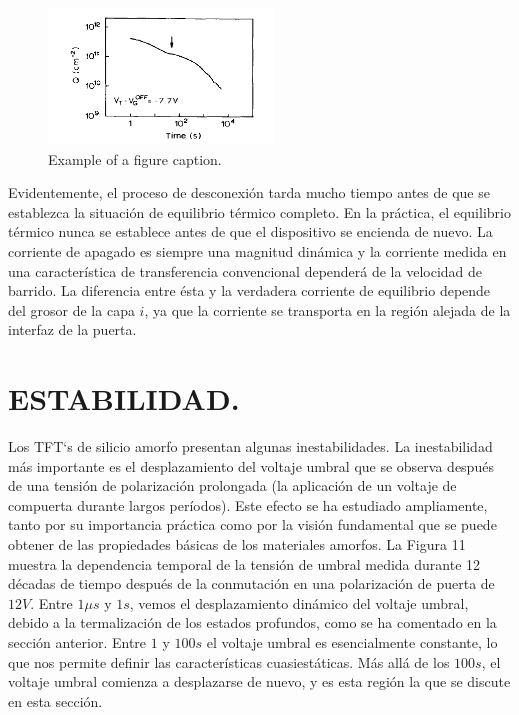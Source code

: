 \documentclass[conference]{IEEEtran}
\begin{document}
\begin{figure}[htbp]
    \centerline{\includegraphics[width=6.0cm]{img/imagen-10.png}}
    \caption{Example of a figure caption.}%
    \label{fig10}
\end{figure} 

    Evidentemente, el proceso de desconexión tarda mucho tiempo antes de que se establezca la 
    situación de equilibrio térmico completo. En la práctica, el equilibrio térmico nunca se 
    establece antes de que el dispositivo se encienda de nuevo. La corriente de apagado es siempre 
    una magnitud dinámica y la corriente medida en una característica de transferencia convencional 
    dependerá de la velocidad de barrido. La diferencia entre ésta y la verdadera corriente de 
    equilibrio depende del grosor de la capa $i$, ya que la corriente se transporta en la región 
    alejada de la interfaz de la puerta.

\section{ESTABILIDAD.}

    Los TFT`s de silicio amorfo presentan algunas inestabilidades. La inestabilidad más importante 
    es el desplazamiento del voltaje umbral que se observa después de una tensión de polarización 
    prolongada (la aplicación de un voltaje de compuerta durante largos períodos). Este efecto se 
    ha estudiado ampliamente, tanto por su importancia práctica como por la visión fundamental que 
    se puede obtener de las propiedades básicas de los materiales amorfos. La Figura 11 muestra la 
    dependencia temporal de la tensión de umbral medida durante 12 décadas de tiempo después de la 
    conmutación en una polarización de puerta de $12 V$. Entre $1 \mu s$ y $1 s$, vemos el 
    desplazamiento dinámico del voltaje umbral, debido a la termalización de los estados profundos, 
    como se ha comentado en la sección anterior. Entre $1$ y $100 s$ el voltaje umbral es 
    esencialmente constante, lo que nos permite definir las características cuasiestáticas. 
    Más allá de los $100 s$, el voltaje umbral comienza a desplazarse de nuevo, y es esta región 
    la que se discute en esta sección.
\end{document}
